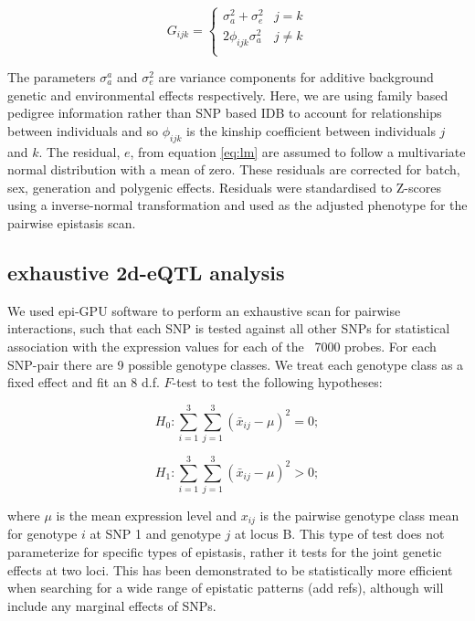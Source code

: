 \documentclass[paper=a4, fontsize=11pt]{scrartcl}	%
\numberwithin{equation}{section}									%
\numberwithin{figure}{section}										%
\numberwithin{table}{section}										%
\begin{document}
\begin{equation}
G_{ijk} = \left \{ 
\begin{array}{ll}
\sigma _a ^2 + \sigma _e ^2&        j = k \\ 
2\phi _{ijk} \sigma _a ^2& 			j \neq k \\
\end{array} \right.
\end{equation}

The parameters $\sigma _a ^a$ and $\sigma _e ^2$ are variance components for additive background genetic and environmental effects respectively. Here, we are using family based pedigree information rather than SNP based IDB to account for relationships between individuals and so $\phi _{ijk}$ is the kinship coefficient between individuals $j$ and $k$. The residual, $e$, from equation \ref{eq:lm} are assumed to follow a multivariate normal distribution with a mean of zero. These residuals are corrected for batch, sex, generation and polygenic effects. Residuals were standardised to Z-scores using a inverse-normal transformation and used as the adjusted phenotype for the pairwise epistasis scan. 

\subsection{exhaustive 2d-eQTL analysis}
We used epi-GPU software to perform an exhaustive scan for pairwise interactions, such that each SNP is tested against all other SNPs for statistical association with the expression values for each of the ~7000 probes. For each SNP-pair there are 9 possible genotype classes. We treat each genotype class as a fixed effect and fit an 8 d.f. $F$-test to test the following hypotheses:

\begin{equation}
H _0 : \sum _{i=1} ^3 \sum _{j=1} ^3 (\bar x _{ij} - \mu) ^2 = 0; 
\end{equation}

\begin{equation}
H _1 : \sum _{i=1} ^3 \sum _{j=1} ^3 (\bar x _{ij} - \mu) ^2 > 0; 
\label{eq:8df}
\end{equation}

where $\mu$ is the mean expression level and $x _{ij}$ is the pairwise genotype class mean for genotype $i$ at SNP 1 and genotype $j$ at locus B. This type of test does not parameterize for specific types of epistasis, rather it tests for the joint genetic effects at two loci. This has been demonstrated to be statistically more efficient when searching for a wide range of epistatic patterns (add refs), although will include any marginal effects of SNPs. \\[0.2cm]
 
\end{document}
